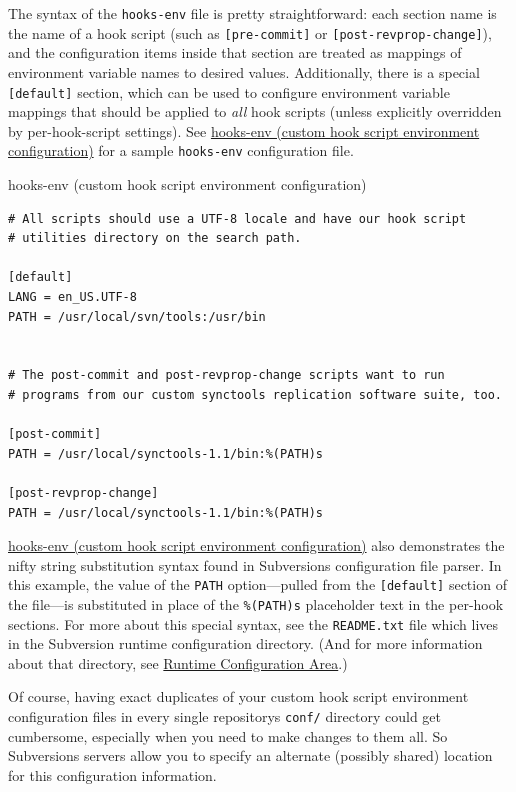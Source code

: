 The syntax of the \texttt{hooks-env} file is pretty straightforward:
each section name is the name of a hook script (such as
\texttt{{[}pre-commit{]}} or \texttt{{[}post-revprop-change{]}}), and
the configuration items inside that section are treated as mappings of
environment variable names to desired values. Additionally, there is a
special \texttt{{[}default{]}} section, which can be used to configure
environment variable mappings that should be applied to \emph{all} hook
scripts (unless explicitly overridden by per-hook-script settings). See
\hyperref[svn.reposadmin.hooks.configuration.ex-1]{hooks-env (custom
hook script environment configuration)} for a sample \texttt{hooks-env}
configuration file.

\protect{}\label{svn.reposadmin.hooks.configuration.ex-1}
hooks-env (custom hook script environment configuration)

\begin{verbatim}
# All scripts should use a UTF-8 locale and have our hook script
# utilities directory on the search path.

[default]
LANG = en_US.UTF-8
PATH = /usr/local/svn/tools:/usr/bin


# The post-commit and post-revprop-change scripts want to run
# programs from our custom synctools replication software suite, too.

[post-commit]
PATH = /usr/local/synctools-1.1/bin:%(PATH)s

[post-revprop-change]
PATH = /usr/local/synctools-1.1/bin:%(PATH)s
\end{verbatim}

\hyperref[svn.reposadmin.hooks.configuration.ex-1]{hooks-env (custom
hook script environment configuration)} also demonstrates the nifty
string substitution syntax found in Subversion\textquotesingle s
configuration file parser. In this example, the value of the
\texttt{PATH} option---pulled from the \texttt{{[}default{]}} section of
the file---is substituted in place of the \texttt{\%(PATH)s} placeholder
text in the per-hook sections. For more about this special syntax, see
the \texttt{README.txt} file which lives in the Subversion runtime
configuration directory. (And for more information about that directory,
see \hyperref[svn.advanced.confarea]{Runtime Configuration Area}.)

Of course, having exact duplicates of your custom hook script
environment configuration files in every single
repository\textquotesingle s \texttt{conf/} directory could get
cumbersome, especially when you need to make changes to them all. So
Subversion\textquotesingle s servers allow you to specify an alternate
(possibly shared) location for this configuration information.

